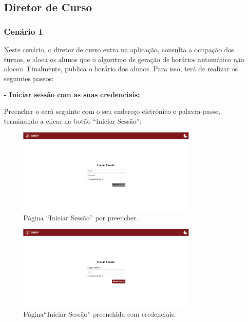 \documentclass[12pt, a4paper]{article}
\begin{document}
\subsection{Diretor de Curso}

\subsubsection{Cenário 1}

Neste cenário, o diretor de curso entra na aplicação, consulta a ocupação dos turnos, e aloca os
alunos que o algoritmo de geração de horários automático não alocou. Finalmente, publica o horário
dos alunos. Para isso, terá de realizar os seguintes passos:

\textbf{- Iniciar sessão com as suas credenciais:}

Preencher o ecrã seguinte com o seu endereço eletrónico e palavra-passe, terminando a clicar no
botão ``Iniciar Sessão'':

\begin{figure}[H]
    \centering
    \includegraphics[width=0.8\textwidth]{res/manual/pagina_login_vazia.png}
    \caption{Página ``Iniciar Sessão'' por preencher.}
    \label{pagina_login_vazia}
\end{figure}

\begin{figure}[H]
    \centering
    \includegraphics[width=0.8\textwidth]{res/manual/login_diretor.png}
    \caption{Página``Iniciar Sessão'' preenchida com credenciais.}
    \label{login_diretor}
\end{figure}
\end{document}
